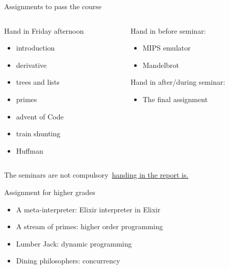 \begin{frame}{Assignments to pass the course}

\begin{columns}
 \begin{column}{0.6\linewidth}
   Hand in Friday afternoon
   \begin{itemize}
   \item introduction
   \item derivative
   \item trees and lists
   \item primes
   \item advent of Code
   \item train shunting
   \item Huffman 
   \end{itemize}
 \end{column}
 \begin{column}{0.4\linewidth}

   \pause
   Hand in before seminar:
   \begin{itemize}
   \item MIPS emulator
   \item Mandelbrot 
   \end{itemize}

   \pause\vspace{20pt}
   Hand in after/during seminar:
   \begin{itemize}
     \item The final assignment
   \end{itemize}
 \end{column}
\end{columns}

\pause \vspace{20pt}
The seminars are not compulsory\pause\ \underline{handing in the report is.}

\end{frame}

\begin{frame}{Assignment for higher grades}

  \begin{itemize}
    \item A meta-interpreter: Elixir interpreter in Elixir \pause
    \item A stream of primes: higher order programming\pause
    \item Lumber Jack: dynamic programming\pause
    \item Dining philosophers: concurrency\pause
  \end{itemize}

\end{frame}

